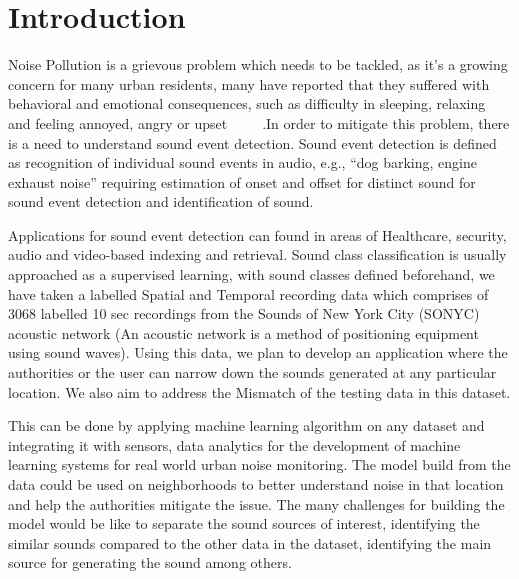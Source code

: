 \section{Introduction}
Noise Pollution is a grievous problem which needs to be tackled, as it’s a growing concern for many urban residents, many have reported that they suffered with behavioral and emotional consequences, such as difficulty in sleeping, relaxing and feeling annoyed, angry or upset ~\cite{1} ~\cite{2} ~\cite{3}.In order to mitigate this problem, there is a need to understand sound event detection. Sound event detection is defined as recognition of individual sound events in audio, e.g., “dog barking, engine exhaust noise” requiring estimation of onset and offset for distinct sound for sound event detection and identification of sound.

 Applications for sound event detection can found in areas of Healthcare, security, audio and video-based indexing and retrieval. Sound class classification is usually approached as a supervised learning, with sound classes defined beforehand, we have taken a labelled Spatial and Temporal recording data which comprises of 3068 labelled 10 sec recordings from the Sounds of New York City (SONYC) acoustic network (An acoustic network is a method of positioning equipment using sound waves). Using this data, we plan to develop an application where the authorities or the user can narrow down the sounds generated at any particular location. We also aim to address the Mismatch of the testing data in this dataset.


This can be done by applying machine learning algorithm on any dataset and integrating it with sensors, data analytics for the development of machine learning systems for real world urban noise monitoring. The model build from the data could be used on neighborhoods to better understand noise in that location and help the authorities mitigate the issue. The many challenges for building the model would be like to separate the sound sources of interest, identifying the similar sounds compared to the other data in the dataset, identifying the main source for generating the sound among others.     
